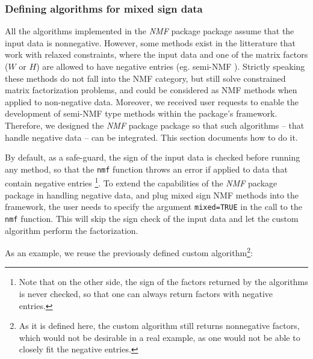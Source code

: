 \documentclass[a4paper]{article}\usepackage{graphicx, color}
\let\code=\texttt
\newcommand{\pkgname}[1]{\textit{#1}\xspace}
\newcommand{\Rpkg}[1]{\pkgname{#1} package\xspace}
\newcommand{\nmfpack}{\Rpkg{NMF}}
\renewcommand{\cite}[1]{\parencite{#1}}
\begin{document}
\subsubsection{Defining algorithms for mixed sign data}
All the algorithms implemented in the \nmfpack package assume that the input data is nonnegative.
However, some methods exist in the litterature that work with relaxed constraints, where the input data and one of the matrix factors ($W$ or $H$) are allowed to have negative entries (eg. semi-NMF \cite{Ding2010, Roux2008}).
Strictly speaking these methods do not fall into the NMF category, but still solve constrained matrix factorization problems, and could be considered as NMF methods when applied to non-negative data.
Moreover, we received user requests to enable the development of semi-NMF type methods within the package's framework.
Therefore, we designed the \nmfpack package so that such algorithms -- that handle negative data -- can be integrated. This section documents how to do it.

By default, as a safe-guard, the sign of the input data is checked before running any method, so that the \code{nmf} function throws an error if applied to data that contain negative entries \footnote{Note that on the other side, the sign of the factors returned by the algorithms is never checked, so that one can always return factors with negative entries.}.
To extend the capabilities of the \nmfpack package in handling negative data, and plug mixed sign NMF methods into the framework, the user needs to specify the argument \code{mixed=TRUE} in the call to the \code{nmf} function.
This will skip the sign check of the input data and let the custom algorithm perform the factorization.
 
As an example, we reuse the previously defined custom algorithm\footnote{As it is defined here, the custom algorithm still returns nonnegative factors, which would not be desirable in a real example, as one would not be able to closely fit the negative entries.}:
\end{document}
